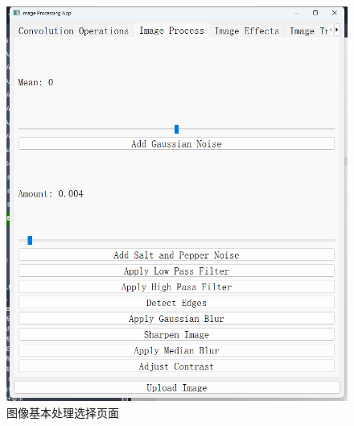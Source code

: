 \documentclass[a4paper,12pt]{article}
\begin{document}
\begin{figure}[htbp]
\begin{minipage}[b]{0.48\textwidth}
        \includegraphics[width=\linewidth]{images/Design/image_processing/GUI/2.png}
        \caption{图像基本处理选择页面}
    \end{minipage}
    
    \vspace{0.2cm}
    

\end{figure}
\end{document}
